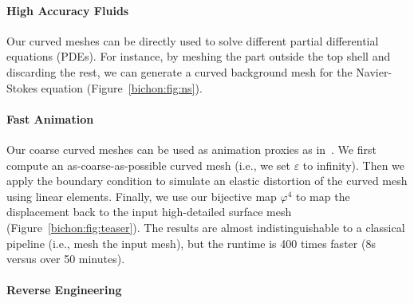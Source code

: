\paragraph{High Accuracy Fluids}
Our curved meshes can be directly used to solve different partial differential equations (PDEs). For instance, by meshing the part outside the top shell and discarding the rest, we can generate a curved background mesh for the Navier-Stokes equation (Figure~\ref{bichon:fig:ns}). 


\paragraph{Fast Animation}
Our coarse curved meshes can be {used} as animation proxies as in~\cite{mezger2007finite,Suwelack2013}. We first compute an as-coarse-as-possible curved mesh (i.e., we set $\varepsilon$ to infinity). Then we apply the boundary condition to simulate an elastic distortion of the curved mesh using linear elements. Finally, we use our bijective map $\varphi^4$ to map the displacement back to the input high-detailed surface mesh (Figure~\ref{bichon:fig:teaser}). The results are almost indistinguishable {to} a classical pipeline (i.e., mesh the input mesh), but the runtime is 400 times faster (8s versus over 50 minutes). 



\paragraph{Reverse Engineering}





